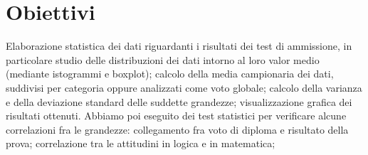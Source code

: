 \section{Obiettivi}

Elaborazione statistica dei dati riguardanti i risultati dei test di ammissione,
in particolare studio delle distribuzioni dei dati intorno al loro valor medio
(mediante istogrammi e boxplot); calcolo della media campionaria dei dati,
suddivisi per categoria oppure analizzati come voto globale; calcolo della varianza
e della deviazione standard delle suddette grandezze; visualizzazione grafica
dei risultati ottenuti. Abbiamo poi eseguito dei test statistici per verificare
alcune correlazioni fra le grandezze: collegamento fra voto di diploma e risultato
della prova; correlazione tra le attitudini in logica e in matematica;
